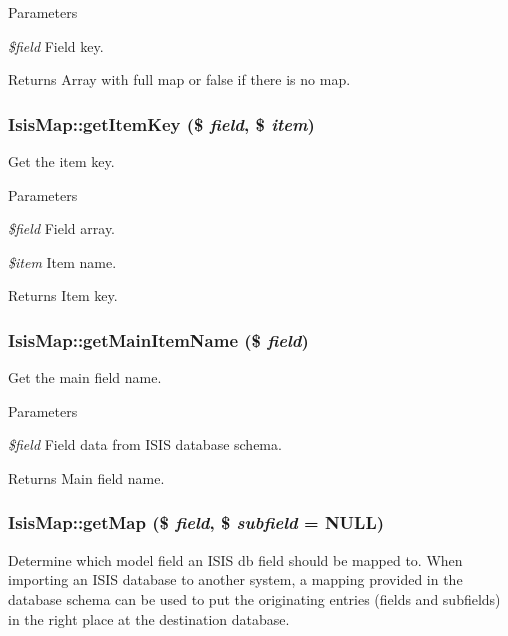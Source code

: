 \begin{DoxyParams}{Parameters}
\item[{\em \$field}]Field key.\end{DoxyParams}
\begin{DoxyReturn}{Returns}
Array with full map or false if there is no map. 
\end{DoxyReturn}
\hypertarget{classIsisMap_a994934784caa4149737bda55160a459f}{
\subsubsection[{getItemKey}]{\setlength{\rightskip}{0pt plus 5cm}IsisMap::getItemKey (\$ {\em field}, \/  \$ {\em item})}}
\label{classIsisMap_a994934784caa4149737bda55160a459f}
Get the item key.


\begin{DoxyParams}{Parameters}
\item[{\em \$field}]Field array.\item[{\em \$item}]Item name.\end{DoxyParams}
\begin{DoxyReturn}{Returns}
Item key. 
\end{DoxyReturn}
\hypertarget{classIsisMap_af689f27e67b0b38a3e880ead17a487f5}{
\subsubsection[{getMainItemName}]{\setlength{\rightskip}{0pt plus 5cm}IsisMap::getMainItemName (\$ {\em field})}}
\label{classIsisMap_af689f27e67b0b38a3e880ead17a487f5}
Get the main field name.


\begin{DoxyParams}{Parameters}
\item[{\em \$field}]Field data from ISIS database schema.\end{DoxyParams}
\begin{DoxyReturn}{Returns}
Main field name. 
\end{DoxyReturn}
\hypertarget{classIsisMap_a29eb2c45b51f95fdfb9ff7af770ca6ce}{
\subsubsection[{getMap}]{\setlength{\rightskip}{0pt plus 5cm}IsisMap::getMap (\$ {\em field}, \/  \$ {\em subfield} = {\ttfamily NULL})}}
\label{classIsisMap_a29eb2c45b51f95fdfb9ff7af770ca6ce}
Determine which model field an ISIS db field should be mapped to. When importing an ISIS database to another system, a mapping provided in the database schema can be used to put the originating entries (fields and subfields) in the right place at the destination database.

